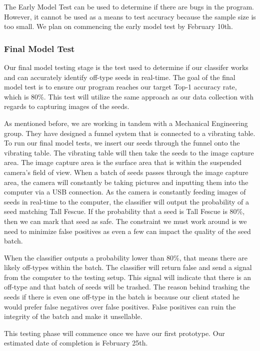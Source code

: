 \documentclass[onecolumn, draftclsnofoot,10pt, compsoc]{IEEEtran}
\begin{document}
The Early Model Test can be used to determine if there are bugs in the program. However, it cannot be used as a means to test accuracy because the sample size is too small. We plan on commencing the early model test by February 10th.  

\subsubsection{Final Model Test}

Our final model testing stage is the test used to determine if our classifer works and can accurately identify off-type seeds in real-time. The goal of the final model test is to ensure our program reaches our target Top-1 accuracy rate, which is 80\%. This test will utilize the same approach as our data collection with regards to capturing images of the seeds.

As mentioned before, we are working in tandem with a Mechanical Engineering group. They have designed a funnel system that is connected to a vibrating table. To run our final model tests, we insert our seeds through the funnel onto the vibrating table. The vibrating table will then take the seeds to the image capture area. The image capture area is the surface area that is within the suspended camera's field of view. When a batch of seeds passes through the image capture area, the camera will constantly be taking pictures and inputting them into the computer via a USB connection. As the camera is constantly feeding images of seeds in real-time to the computer, the classifier will output the probability of a seed matching Tall Fescue. If the probability that a seed is Tall Fescue is 80\%, then we can mark that seed as safe. The constraint we must work around is we need to minimize false positives as even a few can impact the quality of the seed batch. 

When the classifier outputs a probability lower than 80\%, that means there are likely off-types within the batch. The classifier will return false and send a signal from the computer to the testing setup. This signal will indicate that there is an off-type and that batch of seeds will be trashed. The reason behind trashing the seeds if there is even one off-type in the batch is because our client stated he would prefer false negatives over false positives. False positives can ruin the integrity of the batch and make it unsellable. 

This testing phase will commence once we have our first prototype. Our estimated date of completion is February 25th. 
\end{document}
